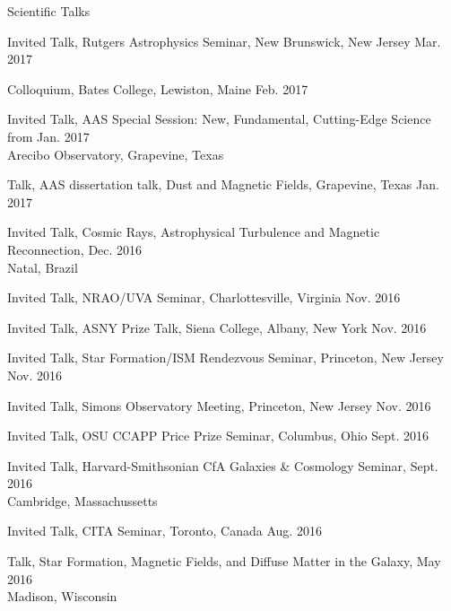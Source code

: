 \documentclass{resume_clark} %
\begin{document}
\begin{rSection}{Scientific Talks}
\begin{etaremune}[itemsep=-1.8mm]
\item Invited Talk, Rutgers Astrophysics Seminar, New Brunswick, New Jersey \hfill{Mar. 2017}

\item Colloquium, Bates College, Lewiston, Maine \hfill{Feb. 2017}

\item Invited Talk, AAS Special Session: New, Fundamental, Cutting-Edge Science from \hfill{Jan. 2017} \\ Arecibo Observatory, Grapevine, Texas

\item Talk, AAS dissertation talk, Dust and Magnetic Fields, Grapevine, Texas \hfill{Jan. 2017}

\item Invited Talk, Cosmic Rays, Astrophysical Turbulence and Magnetic Reconnection, \hfill{Dec. 2016}\\
Natal, Brazil 

\item Invited Talk, NRAO/UVA Seminar, Charlottesville, Virginia \hfill{Nov. 2016}

\item Invited Talk, ASNY Prize Talk, Siena College, Albany, New York \hfill{Nov. 2016}

\item Invited Talk, Star Formation/ISM Rendezvous Seminar, Princeton, New Jersey \hfill{Nov. 2016}

\item Invited Talk, Simons Observatory Meeting, Princeton, New Jersey \hfill{Nov. 2016}

\item Invited Talk, OSU CCAPP Price Prize Seminar, Columbus, Ohio \hfill{Sept. 2016}

\item Invited Talk, Harvard-Smithsonian CfA Galaxies \& Cosmology Seminar, \hfill{Sept. 2016}\\
Cambridge, Massachussetts

\item Invited Talk, CITA Seminar, Toronto, Canada \hfill {Aug. 2016}

\item Talk, Star Formation, Magnetic Fields, and Diffuse Matter in the Galaxy, \hfill{May 2016}\\
Madison, Wisconsin 


\end{etaremune}
\end{rSection}
\end{document}
